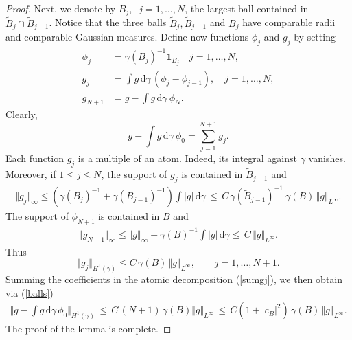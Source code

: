 \documentclass{amsart}                 %
\numberwithin{equation}{section}
\renewcommand\mod[1]{\left\vert{#1}\right\vert}
\newcommand\norm[2]{{\Vert{#1}\Vert_{#2}}}
\newcommand\wrt{\,\mathrm{d}}
\newcommand\1{{\bf 1}}
\newcommand\huat[1]{H^1(#1)}
\newcommand\One{{\mathbf{1}}}
\begin{document}
\begin{proof}
Next, we denote by $B _j, \;\;j=1,\ldots, N$, the largest ball 
contained in $\tilde{B}_j \cap\tilde{B}_{j-1} $. Notice that the
three balls  $\tilde{B}_j, \tilde{B}_{j-1}$  and  $B _j$ have comparable
radii and comparable Gaussian measures.
Define now functions $\phi  _j$ and $g  _j$ by 
setting
\begin{align*}
\phi  _j&=\gamma(B _j )^{-1} \One_{B _j }  \quad j=1,\ldots,N, 
\\ 
g _j &=   \int  g \wrt\gamma\, \left(\phi_{j} -\phi _{j-1} \right), \quad 
j=1,\ldots,N, \\ 
g_{N+1} &=g -\int g  \wrt \gamma \: \phi_{N}.
\end{align*}
Clearly,
\begin{equation}\label{sumgj}
g-\int g\wrt\gamma\: \phi_0 = \sum_{j=1}^{N+1} g  _j.
\end{equation}
Each function $g  _j$ is a multiple of an atom. Indeed, its integral against
 $\gamma$ vanishes. Moreover,
if $1 \le j \le N$, the support of $g  _j$ is contained in $\tilde{B} _{j-1}$ 
and   
\begin{align*}
\norm{g _j}{\infty}\le (\gamma(B_{j})^{-1} + \gamma(B_{j-1})^{-1}) \int \mod{g}\wrt\gamma\,
\le \,C\, \gamma(\tilde{B}_{j-1})^{-1}\ \gamma (B)\, \norm{g}{L^\infty}.
\end{align*}
The support of $\phi_{N+1}$ is contained in $B$ and
\begin{align*}
\norm{g_{N+1}}{\infty}\le \norm{g}{\infty}+\gamma(B)^
{-1}\int \mod{g}\wrt\gamma 
\le\,C\, \norm{g}{L^\infty}.
\end{align*}
Thus
$$
\norm{g _j}{H^1(\gamma)}\le C\,\gamma(B)\, \norm{g}{L^\infty}, \qquad j=1,\ldots,N+1.
$$
Summing the coefficients in the atomic decomposition (\ref{sumgj}), we then obtain
via (\ref{balls})
\begin{align*}
\norm{g-\int g\wrt\gamma\,\phi_0}{\huat{\gamma}}
\,\le\, C\, (N+1) \,\gamma(B) \norm{g}{L^\infty} \,
\le\,C (1+\mod{c_B}^2)\,\gamma(B) \,\norm{g}{L^\infty}.
\end{align*}
The proof of the lemma is complete.
\end{proof}
\end{document}
